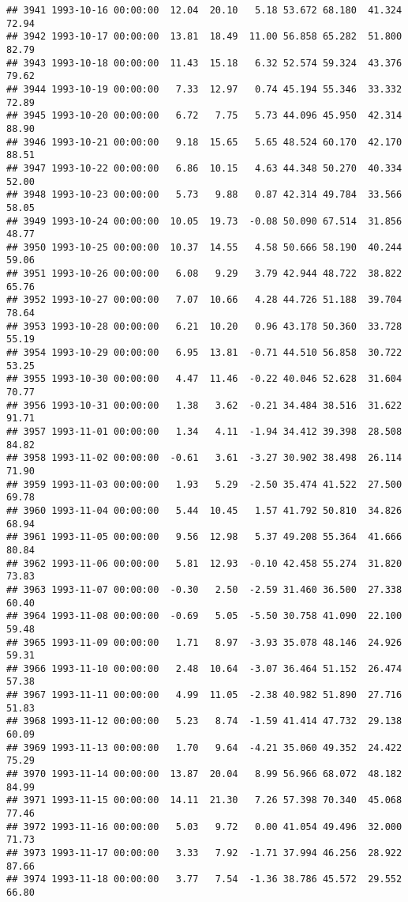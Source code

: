 \documentclass{article}\usepackage{graphicx, color}
\makeatletter
\newenvironment{kframe}{%
 \def\at@end@of@kframe{}%
 \ifinner\ifhmode%
  \def\at@end@of@kframe{\end{minipage}}%
  \begin{minipage}{\columnwidth}%
 \fi\fi%
 \def\FrameCommand##1{\hskip\@totalleftmargin \hskip-\fboxsep
 \colorbox{shadecolor}{##1}\hskip-\fboxsep
     \hskip-\linewidth \hskip-\@totalleftmargin \hskip\columnwidth}%
 \MakeFramed {\advance\hsize-\width
   \@totalleftmargin\z@ \linewidth\hsize
   \@setminipage}}%
 {\par\unskip\endMakeFramed%
 \at@end@of@kframe}
\newenvironment{knitrout}{}{} %
\makeatother
\begin{document}
\begin{knitrout}
\begin{kframe}
\begin{verbatim}
## 3941 1993-10-16 00:00:00  12.04  20.10   5.18 53.672 68.180  41.324  72.94
## 3942 1993-10-17 00:00:00  13.81  18.49  11.00 56.858 65.282  51.800  82.79
## 3943 1993-10-18 00:00:00  11.43  15.18   6.32 52.574 59.324  43.376  79.62
## 3944 1993-10-19 00:00:00   7.33  12.97   0.74 45.194 55.346  33.332  72.89
## 3945 1993-10-20 00:00:00   6.72   7.75   5.73 44.096 45.950  42.314  88.90
## 3946 1993-10-21 00:00:00   9.18  15.65   5.65 48.524 60.170  42.170  88.51
## 3947 1993-10-22 00:00:00   6.86  10.15   4.63 44.348 50.270  40.334  52.00
## 3948 1993-10-23 00:00:00   5.73   9.88   0.87 42.314 49.784  33.566  58.05
## 3949 1993-10-24 00:00:00  10.05  19.73  -0.08 50.090 67.514  31.856  48.77
## 3950 1993-10-25 00:00:00  10.37  14.55   4.58 50.666 58.190  40.244  59.06
## 3951 1993-10-26 00:00:00   6.08   9.29   3.79 42.944 48.722  38.822  65.76
## 3952 1993-10-27 00:00:00   7.07  10.66   4.28 44.726 51.188  39.704  78.64
## 3953 1993-10-28 00:00:00   6.21  10.20   0.96 43.178 50.360  33.728  55.19
## 3954 1993-10-29 00:00:00   6.95  13.81  -0.71 44.510 56.858  30.722  53.25
## 3955 1993-10-30 00:00:00   4.47  11.46  -0.22 40.046 52.628  31.604  70.77
## 3956 1993-10-31 00:00:00   1.38   3.62  -0.21 34.484 38.516  31.622  91.71
## 3957 1993-11-01 00:00:00   1.34   4.11  -1.94 34.412 39.398  28.508  84.82
## 3958 1993-11-02 00:00:00  -0.61   3.61  -3.27 30.902 38.498  26.114  71.90
## 3959 1993-11-03 00:00:00   1.93   5.29  -2.50 35.474 41.522  27.500  69.78
## 3960 1993-11-04 00:00:00   5.44  10.45   1.57 41.792 50.810  34.826  68.94
## 3961 1993-11-05 00:00:00   9.56  12.98   5.37 49.208 55.364  41.666  80.84
## 3962 1993-11-06 00:00:00   5.81  12.93  -0.10 42.458 55.274  31.820  73.83
## 3963 1993-11-07 00:00:00  -0.30   2.50  -2.59 31.460 36.500  27.338  60.40
## 3964 1993-11-08 00:00:00  -0.69   5.05  -5.50 30.758 41.090  22.100  59.48
## 3965 1993-11-09 00:00:00   1.71   8.97  -3.93 35.078 48.146  24.926  59.31
## 3966 1993-11-10 00:00:00   2.48  10.64  -3.07 36.464 51.152  26.474  57.38
## 3967 1993-11-11 00:00:00   4.99  11.05  -2.38 40.982 51.890  27.716  51.83
## 3968 1993-11-12 00:00:00   5.23   8.74  -1.59 41.414 47.732  29.138  60.09
## 3969 1993-11-13 00:00:00   1.70   9.64  -4.21 35.060 49.352  24.422  75.29
## 3970 1993-11-14 00:00:00  13.87  20.04   8.99 56.966 68.072  48.182  84.99
## 3971 1993-11-15 00:00:00  14.11  21.30   7.26 57.398 70.340  45.068  77.46
## 3972 1993-11-16 00:00:00   5.03   9.72   0.00 41.054 49.496  32.000  71.73
## 3973 1993-11-17 00:00:00   3.33   7.92  -1.71 37.994 46.256  28.922  87.66
## 3974 1993-11-18 00:00:00   3.77   7.54  -1.36 38.786 45.572  29.552  66.80

\end{verbatim}
\end{kframe}
\end{knitrout}
\end{document}
